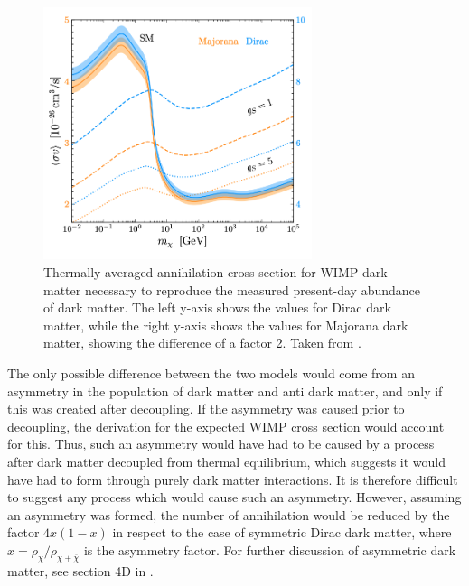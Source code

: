 \begin{figure}[h!]
    \centering
    \includegraphics[width=0.7\textwidth]{figures/sigma_v_dirac_majorana_dm.png}
    \caption{Thermally averaged annihilation cross section for WIMP dark matter necessary to reproduce the measured present-day abundance of dark matter. The left y-axis shows the values for Dirac dark matter, while the right y-axis shows the values for Majorana dark matter, showing the difference of a factor 2. Taken from \cite{Bringmann_2021}. }
    \label{fig:sigmaV_DiracvsMajorana}
\end{figure}

The only possible difference between the two models would come from an asymmetry in the population of dark matter and anti dark matter, and only if this was created after decoupling. If the asymmetry was caused prior to decoupling, the derivation for the expected WIMP cross section would account for this. Thus, such an asymmetry would have had to be caused by a process after dark matter decoupled from thermal equilibrium, which suggests it would have had to form through purely dark matter interactions. It is therefore difficult to suggest any process which would cause such an asymmetry. However, assuming an asymmetry was formed, the number of annihilation would be reduced by the factor $4x(1-x)$ in respect to the case of symmetric Dirac dark matter, where $x = \rho_\chi / \rho_{\chi + \overline{\chi}}$ is the asymmetry factor. For further discussion of asymmetric dark matter, see section 4D in \cite{BAER20151}. 

